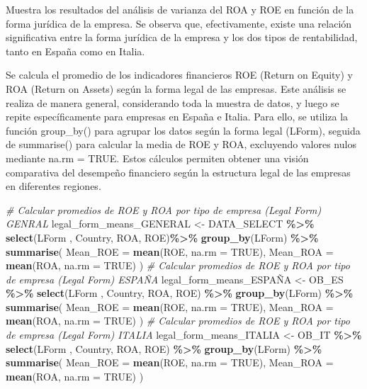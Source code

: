 \documentclass[
]{article}
\newenvironment{Shaded}{\begin{snugshade}}{\end{snugshade}}
\newcommand{\AttributeTok}[1]{\textcolor[rgb]{0.13,0.29,0.53}{#1}}
\newcommand{\CommentTok}[1]{\textcolor[rgb]{0.56,0.35,0.01}{\textit{#1}}}
\newcommand{\ConstantTok}[1]{\textcolor[rgb]{0.56,0.35,0.01}{#1}}
\newcommand{\FunctionTok}[1]{\textcolor[rgb]{0.13,0.29,0.53}{\textbf{#1}}}
\newcommand{\NormalTok}[1]{#1}
\newcommand{\OtherTok}[1]{\textcolor[rgb]{0.56,0.35,0.01}{#1}}
\newcommand{\SpecialCharTok}[1]{\textcolor[rgb]{0.81,0.36,0.00}{\textbf{#1}}}
\begin{document}
Muestra los resultados del análisis de varianza del ROA y ROE en función
de la forma jurídica de la empresa. Se observa que, efectivamente,
existe una relación significativa entre la forma jurídica de la empresa
y los dos tipos de rentabilidad, tanto en España como en Italia.

Se calcula el promedio de los indicadores financieros ROE (Return on
Equity) y ROA (Return on Assets) según la forma legal de las empresas.
Este análisis se realiza de manera general, considerando toda la muestra
de datos, y luego se repite específicamente para empresas en España e
Italia. Para ello, se utiliza la función group\_by() para agrupar los
datos según la forma legal (LForm), seguida de summarise() para calcular
la media de ROE y ROA, excluyendo valores nulos mediante na.rm = TRUE.
Estos cálculos permiten obtener una visión comparativa del desempeño
financiero según la estructura legal de las empresas en diferentes
regiones.

\begin{Shaded}
\begin{Highlighting}[]
\CommentTok{\# Calcular promedios de ROE y ROA por tipo de empresa (Legal Form) GENRAL}
\NormalTok{legal\_form\_means\_GENERAL }\OtherTok{\textless{}{-}}\NormalTok{ DATA\_SELECT }\SpecialCharTok{\%\textgreater{}\%} \FunctionTok{select}\NormalTok{(LForm , Country, ROA, ROE)}\SpecialCharTok{\%\textgreater{}\%} 
  \FunctionTok{group\_by}\NormalTok{(LForm) }\SpecialCharTok{\%\textgreater{}\%}
  \FunctionTok{summarise}\NormalTok{(}
    \AttributeTok{Mean\_ROE =} \FunctionTok{mean}\NormalTok{(ROE, }\AttributeTok{na.rm =} \ConstantTok{TRUE}\NormalTok{),}
    \AttributeTok{Mean\_ROA =} \FunctionTok{mean}\NormalTok{(ROA, }\AttributeTok{na.rm =} \ConstantTok{TRUE}\NormalTok{)}
\NormalTok{  )}
\CommentTok{\# Calcular promedios de ROE y ROA por tipo de empresa (Legal Form) ESPAÑA}
\NormalTok{legal\_form\_means\_ESPAÑA }\OtherTok{\textless{}{-}}\NormalTok{ OB\_ES }\SpecialCharTok{\%\textgreater{}\%} \FunctionTok{select}\NormalTok{(LForm , Country, ROA, ROE) }\SpecialCharTok{\%\textgreater{}\%} 
  \FunctionTok{group\_by}\NormalTok{(LForm) }\SpecialCharTok{\%\textgreater{}\%}
  \FunctionTok{summarise}\NormalTok{(}
    \AttributeTok{Mean\_ROE =} \FunctionTok{mean}\NormalTok{(ROE, }\AttributeTok{na.rm =} \ConstantTok{TRUE}\NormalTok{),}
    \AttributeTok{Mean\_ROA =} \FunctionTok{mean}\NormalTok{(ROA, }\AttributeTok{na.rm =} \ConstantTok{TRUE}\NormalTok{)}
\NormalTok{  )}
\CommentTok{\# Calcular promedios de ROE y ROA por tipo de empresa (Legal Form) ITALIA}
\NormalTok{legal\_form\_means\_ITALIA }\OtherTok{\textless{}{-}}\NormalTok{ OB\_IT }\SpecialCharTok{\%\textgreater{}\%} \FunctionTok{select}\NormalTok{(LForm , Country, ROA, ROE) }\SpecialCharTok{\%\textgreater{}\%} 
  \FunctionTok{group\_by}\NormalTok{(LForm) }\SpecialCharTok{\%\textgreater{}\%}
  \FunctionTok{summarise}\NormalTok{(}
    \AttributeTok{Mean\_ROE =} \FunctionTok{mean}\NormalTok{(ROE, }\AttributeTok{na.rm =} \ConstantTok{TRUE}\NormalTok{),}
    \AttributeTok{Mean\_ROA =} \FunctionTok{mean}\NormalTok{(ROA, }\AttributeTok{na.rm =} \ConstantTok{TRUE}\NormalTok{)}
\NormalTok{  )}
\end{Highlighting}
\end{Shaded}
\end{document}
